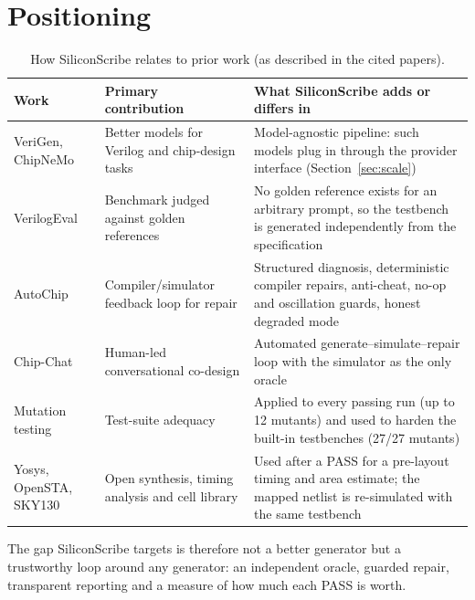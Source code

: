 \section{Positioning}
\begin{table}[H]
\centering
\caption{How SiliconScribe relates to prior work (as described in the cited papers).}
\label{tab:related}
\footnotesize
\begin{tabularx}{\textwidth}{@{}p{2.6cm}p{4.6cm}X@{}}
\toprule
\textbf{Work} & \textbf{Primary contribution} & \textbf{What SiliconScribe adds or differs in} \\
\midrule
VeriGen, ChipNeMo & Better models for Verilog and chip-design tasks & Model-agnostic pipeline: such models plug in through the provider interface (Section~\ref{sec:scale}) \\
VerilogEval & Benchmark judged against golden references & No golden reference exists for an arbitrary prompt, so the testbench is generated independently from the specification \\
AutoChip & Compiler/simulator feedback loop for repair & Structured diagnosis, deterministic compiler repairs, anti-cheat, no-op and oscillation guards, honest degraded mode \\
Chip-Chat & Human-led conversational co-design & Automated generate--simulate--repair loop with the simulator as the only oracle \\
Mutation testing & Test-suite adequacy & Applied to every passing run (up to 12 mutants) and used to harden the built-in testbenches (27/27 mutants) \\
Yosys, OpenSTA, SKY130 & Open synthesis, timing analysis and cell library & Used after a PASS for a pre-layout timing and area estimate; the mapped netlist is re-simulated with the same testbench \\
\bottomrule
\end{tabularx}
\end{table}

The gap SiliconScribe targets is therefore not a better generator but a trustworthy loop around any generator: an independent oracle, guarded repair, transparent reporting and a measure of how much each PASS is worth.
